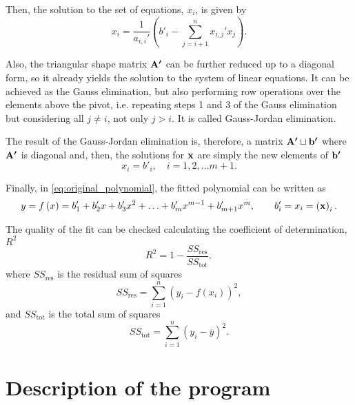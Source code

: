 Then, the solution to the set of equations, $x_{i}$, is given by 
\begin{equation}
    x_i =
    \frac{1}{a_{i,i}'} \left( b'_i - \sum_{j = i + 1}^{n} x_{i,j}' x_{j} \right).
\end{equation}

Also, the triangular shape matrix $\boldsymbol{\mathrm{A'}}$ can be further reduced up to a
diagonal form, so it already yields the solution to the system of linear equations.
It can be achieved as the Gauss elimination, but also performing row operations
over the elements above the pivot, i.e. repeating steps 1 and 3 of the Gauss 
elimination but considering all $j \not = i$, not only $j > i$. It is called
Gauss-Jordan elimination.

The result of the Gauss-Jordan elimination is, therefore, a matrix $\boldsymbol{\mathrm{A'}} \sqcup \boldsymbol{\mathrm{b'}}$
where $\boldsymbol{\mathrm{A'}}$ is diagonal and, then, the solutions for $\boldsymbol{\mathrm{x}}$ are simply the
new elements of $\boldsymbol{\mathrm{b'}}$ 
\begin{equation}
    x_i = b'_{i}, \quad i = 1, 2, \ldots m + 1.
\end{equation}

Finally, in \cref{eq:original_polynomial}, the fitted polynomial can be written as
\begin{equation}\label{eq:general_fitted_polynomial}
    y = f\left( x \right) = b'_1 + b'_2 x + b'_3 x^2 + \ldots + b'_{m} x^{m - 1} + b'_{m+1} x^m,
    \qquad b'_i = x_i = \left( \boldsymbol{\mathrm{x}} \right)_i.
\end{equation}

The quality of the fit can be checked calculating the coefficient of determination,
$R^{2}$ 
\begin{equation}
    R^2 = 1 - \frac{ SS_{\text{res}} }{SS_{\text{tot}}},
\end{equation}
where $SS_{\text{res}}$ is the residual sum of squares 
\begin{equation}
    SS_{\text{res}} = \sum_{i = 1}^{n} \left( y_i - f\left( x_i \right)  \right)^2,
\end{equation}
and $SS_{\text{tot}}$ is the total sum of squares 
\begin{equation}
    SS_{\text{tot}} = \sum_{i = 1}^{n}  \left( y_i - \overline{y} \right)^2.
\end{equation}

\section{Description of the program}\label{descripcion_programa}

